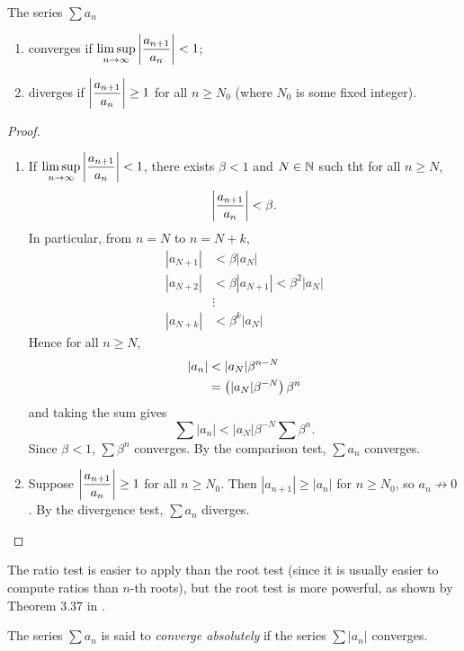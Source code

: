 \begin{lemma}\label{lemma:ratio-test}
The series $\sum a_n$
\begin{enumerate}[label=(\roman*)]
\item converges if $\displaystyle\limsup_{n\to\infty}\left|\frac{a_{n+1}}{a_n}\right|<1$;
\item diverges if $\displaystyle\left|\frac{a_{n+1}}{a_n}\right|\ge1$ for all $n\ge N_0$ (where $N_0$ is some fixed integer).
\end{enumerate}
\end{lemma}

\begin{proof} \
\begin{enumerate}[label=(\roman*)]
\item If $\displaystyle\limsup_{n\to\infty}\left|\frac{a_{n+1}}{a_n}\right|<1$, there exists $\beta<1$ and $N\in\mathbb N$ such tht for all $n\ge N$,
\[\left|\frac{a_{n+1}}{a_n}\right|<\beta.\]
In particular, from $n=N$ to $n=N+k$,
\begin{align*}
|a_{N+1}|&<\beta|a_N|\\
|a_{N+2}|&<\beta|a_{N+1}|<\beta^2|a_N|\\
&\vdots\\
|a_{N+k}|&<\beta^k|a_N|
\end{align*}
Hence for all $n\ge N$,
\begin{align*}
|a_n|&<|a_N|\beta^{n-N}\\
&=\brac{|a_N|\beta^{-N}}\beta^n
\end{align*}
and taking the sum gives
\[\sum|a_n|<|a_N|\beta^{-N}\sum\beta^n.\]
Since $\beta<1$, $\sum\beta^n$ converges. By the comparison test, $\sum a_n$ converges.

\item Suppose $\displaystyle\left|\frac{a_{n+1}}{a_n}\right|\ge1$ for all $n\ge N_0$. Then $|a_{n+1}|\ge|a_n|$ for $n\ge N_0$, so $a_n\not\to0$. By the divergence test, $\sum a_n$ diverges.
\end{enumerate}
\end{proof}

\begin{remark}
The ratio test is easier to apply than the root test (since it is usually easier to compute ratios than $n$-th roots), but the root test is more powerful, as shown by Theorem 3.37 in \cite{rudin}.
\end{remark}

The series $\sum a_n$ is said to \emph{converge absolutely} if the series $\sum|a_n|$ converges.

